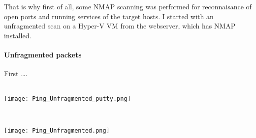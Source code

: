 That is why first of all, some NMAP scanning was performed for reconnaisance of open ports and running services of the target hosts. I started with an unfragmented scan on a Hyper-V VM from the webserver, which has NMAP installed.

\paragraph{Unfragmented packets}
First \ldots.
$\;$ \\ \\
\noindent\begin{minipage}{\textwidth}
    \centering
    \texttt{[image: Ping\_Unfragmented\_putty.png]}
\end{minipage}
$\;$ \\ \\
\noindent\begin{minipage}{\textwidth}
    \centering
    \texttt{[image: Ping\_Unfragmented.png]}
\end{minipage}
